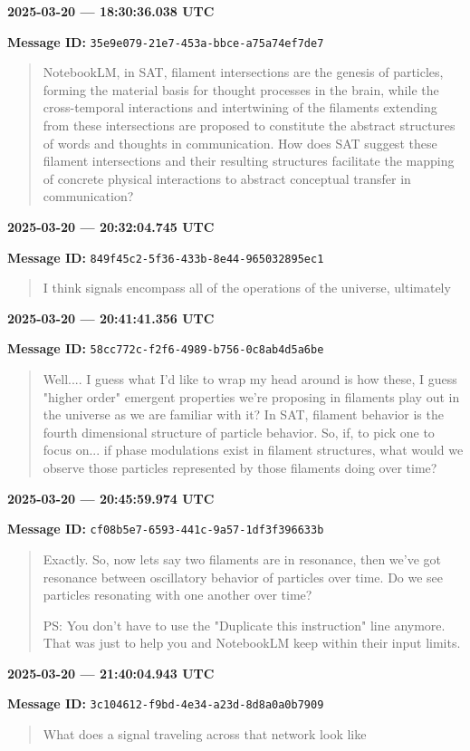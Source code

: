 \documentclass[11pt,letterpaper]{article}
\newcommand{\messageentry}[2]{%
  \Needspace{5\baselineskip}
  \medskip
  {\large\bfseries #1\par}
  {\small\textbf{Message ID:} \texttt{#2}\par}
}
\begin{document}
\messageentry{2025-03-20 --- 18:30:36.038 UTC}{35e9e079-21e7-453a-bbce-a75a74ef7de7}
\begin{quote}\small

NotebookLM, in SAT, filament intersections are the genesis of particles, forming the material basis for thought processes in the brain, while the cross-temporal interactions and intertwining of the filaments extending from these intersections are proposed to constitute the abstract structures of words and thoughts in communication. How does SAT suggest these filament intersections and their resulting structures facilitate the mapping of concrete physical interactions to abstract conceptual transfer in communication?
\end{quote}

\messageentry{2025-03-20 --- 20:32:04.745 UTC}{849f45c2-5f36-433b-8e44-965032895ec1}
\begin{quote}\small
I think signals encompass all of the operations of the universe, ultimately 
\end{quote}

\messageentry{2025-03-20 --- 20:41:41.356 UTC}{58cc772c-f2f6-4989-b756-0c8ab4d5a6be}
\begin{quote}\small
Well.... I guess what I'd like to wrap my head around is how these, I guess "higher order" emergent properties we're proposing in filaments play out in the universe as we are familiar with it? In SAT, filament behavior is the fourth dimensional structure of particle behavior. So, if, to pick one to focus on... if phase modulations exist in filament structures, what would we observe those particles represented by those filaments doing over time? 
\end{quote}

\messageentry{2025-03-20 --- 20:45:59.974 UTC}{cf08b5e7-6593-441c-9a57-1df3f396633b}
\begin{quote}\small
Exactly. So, now lets say two filaments are in resonance, then we've got resonance between oscillatory behavior of particles over time. Do we see particles resonating with one another over time?


PS: You don't have to use the "Duplicate this instruction" line anymore. That was just to help you and NotebookLM keep within their input limits. 
\end{quote}

\messageentry{2025-03-20 --- 21:40:04.943 UTC}{3c104612-f9bd-4e34-a23d-8d8a0a0b7909}
\begin{quote}\small
What does a signal traveling across that network look like 
\end{quote}
\end{document}
